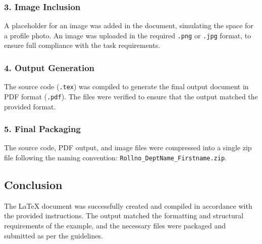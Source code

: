 \subsubsection{3. Image Inclusion}
A placeholder for an image was added in the document, simulating the space for a profile photo. An image was uploaded in the required \texttt{.png} or \texttt{.jpg} format, to ensure full compliance with the task requirements.

\subsubsection{4. Output Generation}
The source code (\texttt{.tex}) was compiled to generate the final output document in PDF format (\texttt{.pdf}). The files were verified to ensure that the output matched the provided format.

\subsubsection{5. Final Packaging}
The source code, PDF output, and image files were compressed into a single zip file following the naming convention: \texttt{Rollno\_DeptName\_Firstname.zip}.

\subsection{Conclusion}
The LaTeX document was successfully created and compiled in accordance with the provided instructions. The output matched the formatting and structural requirements of the example, and the necessary files were packaged and submitted as per the guidelines.

